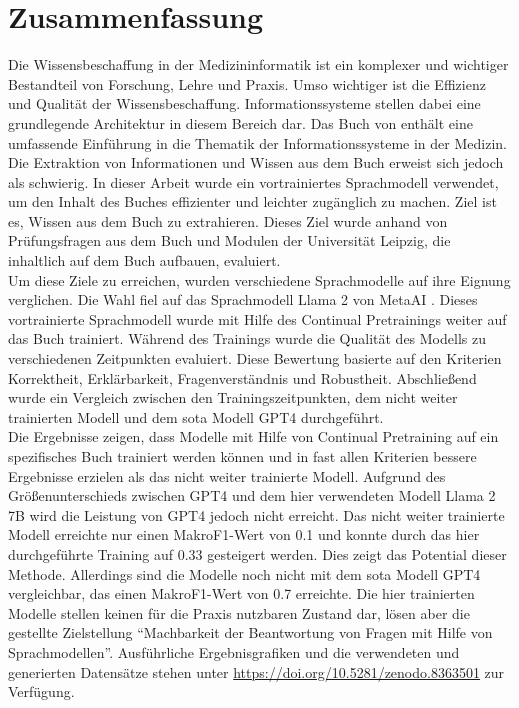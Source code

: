 \chapter*{Zusammenfassung}
Die Wissensbeschaffung in der Medizininformatik ist ein komplexer und wichtiger Bestandteil von Forschung, Lehre und Praxis.
Umso wichtiger ist die Effizienz und Qualität der Wissensbeschaffung.
Informationssysteme stellen dabei eine grundlegende Architektur in diesem Bereich dar.
Das Buch  von \citet{bb} enthält eine umfassende Einführung in die Thematik der Informationssysteme in der Medizin.
Die Extraktion von Informationen und Wissen aus dem Buch erweist sich jedoch als schwierig.
In dieser Arbeit wurde ein vortrainiertes Sprachmodell verwendet, um den Inhalt des Buches effizienter und leichter zugänglich zu machen.
Ziel ist es, Wissen aus dem Buch zu extrahieren.
Dieses Ziel wurde anhand von Prüfungsfragen aus dem Buch und Modulen der Universität Leipzig, die inhaltlich auf dem Buch aufbauen, evaluiert.\\

Um diese Ziele zu erreichen, wurden verschiedene Sprachmodelle auf ihre Eignung verglichen.
Die Wahl fiel auf das Sprachmodell Llama 2 von MetaAI \citep{llama2}.
Dieses vortrainierte Sprachmodell wurde mit Hilfe des Continual Pretrainings weiter auf das Buch trainiert.
Während des Trainings wurde die Qualität des Modells zu verschiedenen Zeitpunkten evaluiert.
Diese Bewertung basierte auf den Kriterien Korrektheit, Erklärbarkeit, Fragenverständnis und Robustheit.
Abschließend wurde ein Vergleich zwischen den Trainingszeitpunkten, dem nicht weiter trainierten Modell und dem \ac{sota} Modell GPT4 durchgeführt.\\

\enlargethispage{0.5\baselineskip}
Die Ergebnisse zeigen, dass Modelle mit Hilfe von Continual Pretraining auf ein spezifisches Buch trainiert werden können und in fast allen Kriterien bessere Ergebnisse erzielen als das nicht weiter trainierte Modell.
Aufgrund des Größenunterschieds zwischen GPT4 und dem hier verwendeten Modell Llama 2 7B wird die Leistung von GPT4 jedoch nicht erreicht.
Das nicht weiter trainierte Modell erreichte nur einen MakroF1-Wert von \num{0.1} und konnte durch das hier durchgeführte Training auf \num{0.33} gesteigert werden.
Dies zeigt das Potential dieser Methode.
Allerdings sind die Modelle noch nicht mit dem \ac{sota} Modell GPT4 vergleichbar, das einen MakroF1-Wert von \num{0.7} erreichte.
Die hier trainierten Modelle stellen keinen für die Praxis nutzbaren Zustand dar, lösen aber die gestellte Zielstellung \enquote{Machbarkeit der Beantwortung von Fragen mit Hilfe von Sprachmodellen}. Ausführliche Ergebnisgrafiken und die verwendeten und generierten Datensätze stehen unter \url{https://doi.org/10.5281/zenodo.8363501} zur Verfügung.\\

